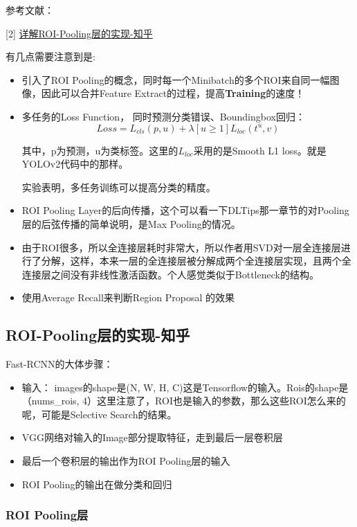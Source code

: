 参考文献：

[2] \href{https://zhuanlan.zhihu.com/p/27640199}{详解ROI-Pooling层的实现-知乎}

有几点需要注意到是:
\begin{itemize}
\item 引入了ROI Pooling的概念，同时每一个Minibatch的多个ROI来自同一幅图像，因此可以合并Feature Extract的过程，提高\textbf{Training}的速度！
\item 多任务的Loss Function， 同时预测分类错误、Boundingbox回归：
\begin{displaymath}
Loss = L_{cls}(p, u) + \lambda [u \ge 1] L_{loc}(t^u, v)
\end{displaymath}

其中，p为预测，u为类标签。这里的$L_{loc}$采用的是Smooth L1 loss。就是YOLOv2代码中的那样。

实验表明，多任务训练可以提高分类的精度。
\item ROI Pooling Layer的后向传播，这个可以看一下DLTips那一章节的对Pooling层的后弦传播的简单说明，是Max Pooling的情况。
\item 由于ROI很多，所以全连接层耗时非常大，所以作者用SVD对一层全连接层进行了分解，这样，本来一层的全连接层被分解成两个全连接层实现，且两个全连接层之间没有非线性激活函数。个人感觉类似于Bottleneck的结构。
\item 使用Average Recall来判断Region Proposal 的效果
\end{itemize}



\subsection{ROI-Pooling层的实现-知乎}

Fast-RCNN的大体步骤：
\begin{itemize}
\item 输入： images的shape是(N, W, H, C)这是Tensorflow的输入。Rois的shape是（nums\_rois, 4）这里注意了，ROI也是输入的参数，那么这些ROI怎么来的呢，可能是Selective Search的结果。

\item VGG网络对输入的Image部分提取特征，走到最后一层卷积层

\item 最后一个卷积层的输出作为ROI Pooling层的输入

\item ROI Pooling的输出在做分类和回归
\end{itemize}

\subsubsection{ROI Pooling层}

